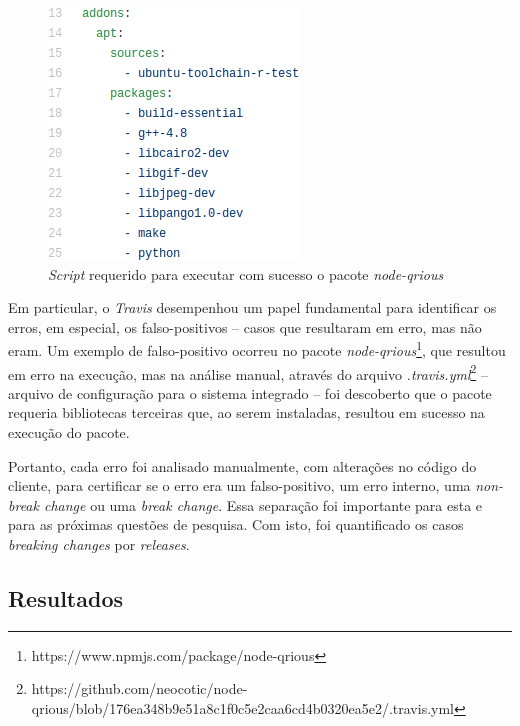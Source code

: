 \begin{itemize}
    \begin{figure}
        \centering
        \includegraphics[scale=0.6]{figuras/false_positive.png}
        \caption{\textit{Script} requerido para executar com sucesso o pacote \textit{node-qrious}}
        \label{fig:false-positive}
    \end{figure}{}

    Em particular, o \textit{Travis} desempenhou um papel fundamental para identificar os erros, em especial, os falso-positivos -- casos que resultaram em erro, mas não eram. Um exemplo de falso-positivo ocorreu no pacote \textit{node-qrious}\footnote{https://www.npmjs.com/package/node-qrious}, que resultou em erro na execução, mas na análise manual, através do arquivo \textit{.travis.yml}\footnote{https://github.com/neocotic/node-qrious/blob/176ea348b9e51a8c1f0c5e2caa6cd4b0320ea5e2/.travis.yml} -- arquivo de configuração para o sistema integrado -- foi descoberto que o pacote requeria bibliotecas terceiras que, ao serem instaladas, resultou em sucesso na execução do pacote.
\end{itemize}{}

Portanto, cada erro foi analisado manualmente, com alterações no código do cliente, para certificar se o erro era um falso-positivo, um erro interno, uma \textit{non-break change} ou uma \textit{break change}. Essa separação foi importante para esta e para as próximas questões de pesquisa. Com isto, foi quantificado os casos \textit{breaking changes} por \textit{releases}.

\subsection{Resultados}
\label{fin:rq1}

